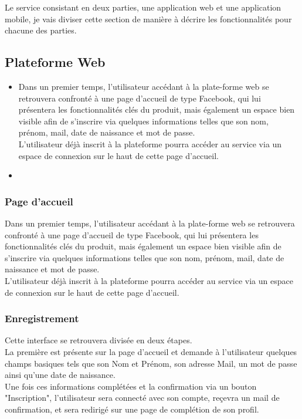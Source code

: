 \documentclass{report}
\begin{document}
	Le service consistant en deux parties, une application web et une application mobile, je vais diviser cette section de manière à décrire les fonctionnalités pour chacune des parties.\\

	\subsection{Plateforme Web}

		\begin{itemize}
			\item Dans un premier temps, l'utilisateur accédant à la plate-forme web se retrouvera confronté à une page d'accueil de type Facebook, qui lui présentera les fonctionnalités clés du produit, mais également un espace bien visible afin de s'inscrire via quelques informations telles que son nom, prénom, mail, date de naissance et mot de passe.\\
			L'utilisateur déjà inscrit à la plateforme pourra accéder au service via un espace de connexion sur le haut de cette page d'accueil.\\
			\item 
		\end{itemize}

		\subsubsection{Page d'accueil}

			Dans un premier temps, l'utilisateur accédant à la plate-forme web se retrouvera confronté à une page d'accueil de type Facebook, qui lui présentera les fonctionnalités clés du produit, mais également un espace bien visible afin de s'inscrire via quelques informations telles que son nom, prénom, mail, date de naissance et mot de passe.\\
			L'utilisateur déjà inscrit à la plateforme pourra accéder au service via un espace de connexion sur le haut de cette page d'accueil.\\

		\subsubsection{Enregistrement}

			Cette interface se retrouvera divisée en deux étapes.\\

			La première est présente sur la page d'accueil et demande à l'utilisateur quelques champs basiques tels que son Nom et Prénom, son adresse Mail, un mot de passe ainsi qu'une date de naissance.\\
			Une fois ces informations complétées et la confirmation via un bouton "Inscription", l'utilisateur sera connecté avec son compte, reçevra un mail de confirmation, et sera redirigé sur une page de complétion de son profil.\\
\end{document}

